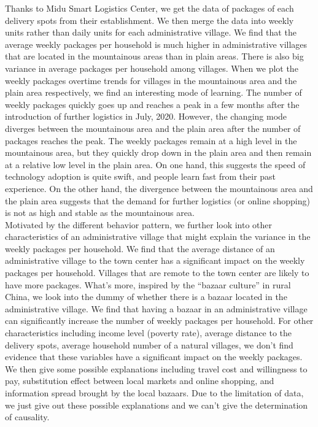 \documentclass{article}
\begin{document}
\mbox{\hspace{2em}}
Thanks to Midu Smart Logistics Center, we get the data of packages of each delivery spots from their establishment. We then merge the data into weekly units rather than daily units for each administrative village. We find that the average weekly packages per household is much higher in administrative villages that are located in the mountainous areas than in plain areas. There is also big variance in average packages per household among villages. When we plot the weekly packages  overtime trends for villages in the mountainous area and the plain area respectively, we find an interesting mode of learning. The number of weekly packages quickly goes up and reaches a peak in a few months after the introduction of further logistics in July, 2020. However, the changing mode diverges between the mountainous area and the plain area after the number of packages reaches the peak. The weekly packages remain at a high level in the mountainous area, but they quickly drop down in the plain area and then remain at a relative low level in the plain area. On one hand, this suggests the speed of technology adoption is quite swift, and people learn fast from their past experience. On the other hand, the divergence between the mountainous area and the plain area suggests that the demand for further logistics (or online shopping) is not as high and stable as the mountainous area.\\
\mbox{\hspace{2em}}
Motivated by the different behavior pattern, we further look into other characteristics of an administrative village that might explain the variance in the weekly packages per household. We find that the average distance of an administrative village to the town center has a significant impact on the weekly packages per household. Villages that are remote to the town center are likely to have more packages. What’s more, inspired by the “bazaar culture” in rural China, we look into the dummy of whether there is a bazaar located in the administrative village. We find that having a bazaar in an administrative village can significantly increase the number of weekly packages per household. For other characteristics including income level (poverty rate), average distance to the delivery spots, average household number of a natural villages, we don’t find evidence that these variables have a significant impact on the weekly packages. We then give some possible explanations including travel cost and willingness to pay, substitution effect between local markets and online shopping, and information spread brought by the local bazaars. Due to the limitation of data, we just give out these possible explanations and we can’t give the determination of causality.\\
\end{document}
